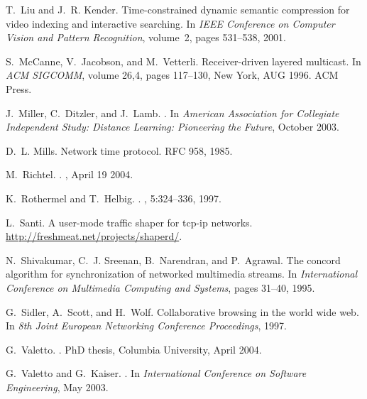 \documentclass{sig-alternate}
\begin{document}
\begin{thebibliography}{10}
T.~Liu and J.~R. Kender.
\newblock Time-constrained dynamic semantic compression for video indexing and
  interactive searching.
\newblock In {\em IEEE Conference on Computer Vision and Pattern Recognition},
  volume~2, pages 531--538, 2001.

S.~McCanne, V.~Jacobson, and M.~Vetterli.
\newblock Receiver-driven layered multicast.
\newblock In {\em {ACM} {SIGCOMM}}, volume 26,4, pages 117--130, New York, AUG
  1996. ACM Press.

J.~Miller, C.~Ditzler, and J.~Lamb.
.
\newblock In {\em American Association for Collegiate Independent Study:
  Distance Learning: Pioneering the Future}, October 2003.

D.~L. Mills.
\newblock Network time protocol.
\newblock RFC 958, 1985.

M.~Richtel.
.
, April 19 2004.

K.~Rothermel and T.~Helbig.
.
, 5:324--336, 1997.

L.~Santi.
\newblock A user-mode traffic shaper for tcp-ip networks.
\newblock \url{http://freshmeat.net/projects/shaperd/}.

N.~Shivakumar, C.~J. Sreenan, B.~Narendran, and P.~Agrawal.
\newblock The concord algorithm for synchronization of networked multimedia
  streams.
\newblock In {\em International Conference on Multimedia Computing and
  Systems}, pages 31--40, 1995.

G.~Sidler, A.~Scott, and H.~Wolf.
\newblock Collaborative browsing in the world wide web.
\newblock In {\em 8th Joint European Networking Conference Proceedings}, 1997.

G.~Valetto.
.
\newblock PhD thesis, Columbia University, April 2004.

G.~Valetto and G.~Kaiser.
.
\newblock In {\em International Conference on Software Engineering}, May 2003.


\end{thebibliography}
\end{document}
